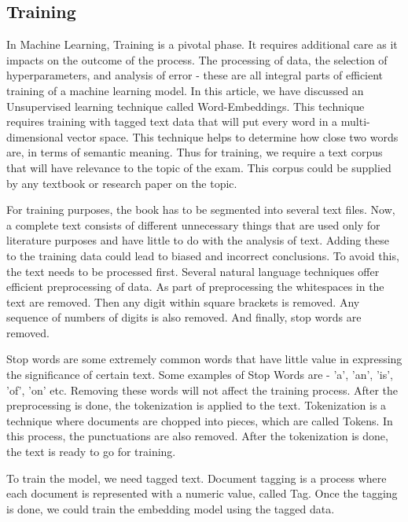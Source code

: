     \subsection{Training}
        \par
        In Machine Learning, Training is a pivotal phase. It requires additional care as it impacts on the 
        outcome of the process.  The processing of data, the selection of hyperparameters, and analysis of 
        error - these are all integral parts of efficient training of a machine learning model. In this article,
        we have discussed an Unsupervised learning technique called Word-Embeddings. This technique requires 
        training with tagged text data that will put every word in a multi-dimensional vector space. 
        This technique helps to determine how close two words are, in terms of semantic meaning. Thus for training,
        we require a text corpus that will have relevance to the topic of the exam. This corpus could be 
        supplied by any textbook or research paper on the topic.
        \par
        For training purposes, the book has to be segmented into several text files. Now, 
        a complete text consists of different unnecessary things that are used only for literature 
        purposes and have little to do with the analysis of text. Adding these to the training data 
        could lead to biased and incorrect conclusions. To avoid this, the text needs to be processed first. 
        Several natural language techniques offer efficient preprocessing of data. As part of preprocessing the 
        whitespaces in the text are removed. Then any digit within square brackets is removed. Any sequence of 
        numbers of digits is also removed. And finally, stop words are removed.
        \par
        Stop words are some extremely common words that have little value in expressing the significance of 
        certain text. Some examples of Stop Words are - 'a', 'an', 'is', 'of', 'on' etc. Removing these words 
        will not affect the training process. After the preprocessing is done, the tokenization is applied to the
        text. Tokenization is a technique where documents are chopped into pieces, which are called Tokens.
        In this process, the punctuations are also removed. After the tokenization is done, the text is ready
        to go for training.
        \par
        To train the model, we need tagged text. Document tagging is a process where each document is 
        represented with a numeric value, called Tag. Once the tagging is done, we could train the embedding model 
        using the tagged data.
    
